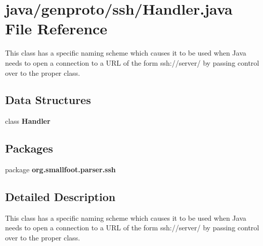 \section{java/genproto/ssh/\+Handler.java File Reference}
\label{ssh_2Handler_8java}


This class has a specific naming scheme which causes it to be used when Java needs to open a connection to a U\+R\+L of the form ssh\+://server/ by passing control over to the proper class.  


\subsection*{Data Structures}
\begin{DoxyCompactItemize}
\item 
class {\bf Handler}
\end{DoxyCompactItemize}
\subsection*{Packages}
\begin{DoxyCompactItemize}
\item 
package {\bf org.\+smallfoot.\+parser.\+ssh}
\end{DoxyCompactItemize}


\subsection{Detailed Description}
This class has a specific naming scheme which causes it to be used when Java needs to open a connection to a U\+R\+L of the form ssh\+://server/ by passing control over to the proper class. 

